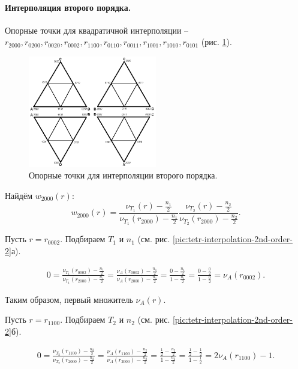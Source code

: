 \paragraph{Интерполяция второго порядка.} Опорные точки для квадратичной интерполяции -- $r_{2000}, r_{0200}, r_{0020}, r_{0002}, r_{1100}, r_{0110}, r_{0011}, r_{1001}, r_{1010}, r_{0101}$ (рис. \ref{pic:tetr-interpolation-2nd-order-1}).

\begin{figure}[h]
\centering
\includegraphics[width=0.5\textwidth]{png/tetr-interp-2nd-order-1.png}
\caption{Опорные точки для интерполяции второго порядка.}
\label{pic:tetr-interpolation-2nd-order-1}
\end{figure}


Найдём $w_{2000}(r)$:
\begin{equation}
w_{2000}(r) = \frac{ \nu_{T_1}(r) - \frac{n_1}{2} }{ \nu_{T_1}(r_{2000}) - \frac{n_1}{2} } \frac{ \nu_{T_2}(r) - \frac{n_2}{2} }{ \nu_{T_2}(r_{2000}) - \frac{n_2}{2} }.
\end{equation}


Пусть $r = r_{0002}$. Подбираем $T_1$ и $n_1$ (см. рис. \ref{pic:tetr-interpolation-2nd-order-2}а).

\begin{eqnarray}
0 = \frac{ \nu_{T_1}(r_{0002}) - \frac{n_1}{2} }{ \nu_{T_1}(r_{2000}) - \frac{n_1}{2} } = \frac{ \nu_{A}(r_{0002}) - \frac{n_1}{2} }{ \nu_{A}(r_{2000}) - \frac{n_1}{2} } = \frac{ 0 - \frac{n_1}{2} }{ 1 - \frac{n_1}{2} } = \frac{ 0 - \frac{0}{2} }{ 1 - \frac{0}{2} } = \nu_{A}(r_{0002}).
\end{eqnarray}

Таким образом, первый множитель $\nu_{A}(r)$.

Пусть $r = r_{1100}$. Подбираем $T_2$ и $n_2$ (см. рис. \ref{pic:tetr-interpolation-2nd-order-2}б).

\begin{eqnarray}
0 = \frac{ \nu_{T_2}(r_{1100}) - \frac{n_2}{2} }{ \nu_{T_2}(r_{2000}) - \frac{n_2}{2} } = \frac{ \nu_{A}(r_{1100}) - \frac{n_2}{2} }{ \nu_{A}(r_{2000}) - \frac{n_2}{2} } = \frac{ \frac{1}{2} - \frac{n_2}{2} }{ 1 - \frac{n_2}{2} } = \frac{ \frac{1}{2} - \frac{1}{2} }{ 1 - \frac{1}{2} } = 2\nu_{A}(r_{1100}) - 1.
\end{eqnarray}

